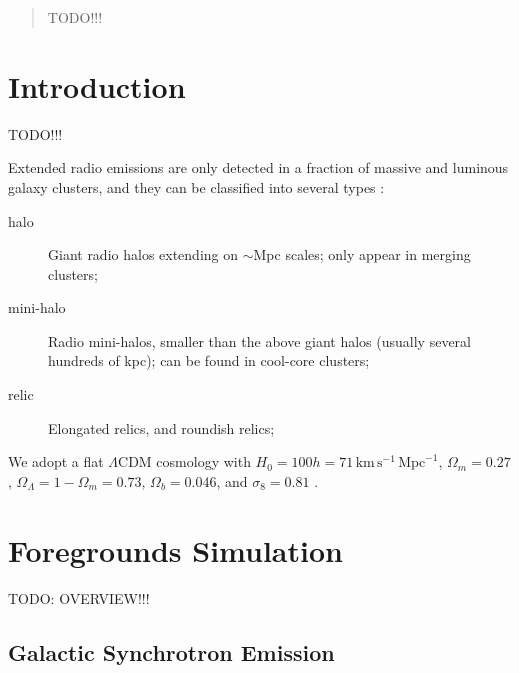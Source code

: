 \documentclass[modern]{aastex61}
\newcommand{\lcdm}{$\Lambda$CDM}
\begin{document}
\author{Haiguang Xu}



\begin{abstract}
TODO!!!
\end{abstract}



\section{Introduction}
\label{sec:intro}

TODO!!!

Extended radio emissions are only detected in a fraction of massive and
luminous galaxy clusters, and they can be classified into several types
\citep[see][for recent reviews]{feretti2012rev,brunetti2014rev}:
\begin{description}
\item[halo]
  Giant radio halos extending on $\sim$Mpc scales;
  only appear in merging clusters;
\item[mini-halo]
  Radio mini-halos, smaller than the above giant halos (usually several
  hundreds of kpc); can be found in cool-core clusters;
\item[relic]
  Elongated relics, and roundish relics;
\end{description}

We adopt a flat \lcdm{} cosmology with
$H_0 = 100 h = 71 \,\mathrm{km}\,\mathrm{s}^{-1}\,\mathrm{Mpc}^{-1}$,
$\Omega_m = 0.27$, $\Omega_{\Lambda} = 1 - \Omega_m = 0.73$,
$\Omega_b = 0.046$, and $\sigma_8 = 0.81$ \citep{komatsu2011}.


\section{Foregrounds Simulation}
\label{sec:fg-simu}

TODO: OVERVIEW!!!

\subsection{Galactic Synchrotron Emission}
\label{sec:fg-gsync}
\end{document}

